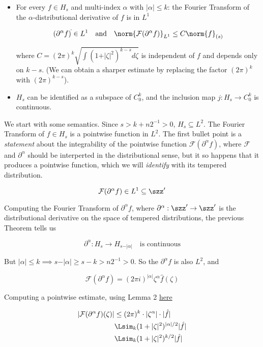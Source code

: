 \begin{itemize}
\item
  For every \(f\in H_s\) and multi-index \(\alpha\) with
  \(\vert\alpha\vert\leq k\): the Fourier Transform of the
  \(\alpha\)-distributional derivative of \(f\) is in \(L^1\)

  \[
    (\partial^\alpha f)^{\hat{ }}\in L^1\quad\text{and}\quad \norm{\mathcal{F}(\partial^\alpha f)}_{L^1}\leq C\norm{f}_{(s)}
    \]

  where \(C=(2\pi)^k\sqrt{\int (1+\vert\zeta\vert^2)^{k-s}d\zeta}\) is
  independent of \(f\) and depends only on \(k-s\). (We can obtain a
  sharper estimate by replacing the factor \((2\pi)^k\) with
  \((2\pi)^{k-s}\)).
\item
  \(H_s\) can be identified as a subspace of \(C_0^k\), and the
  inclusion map \(j: H_s\to C_0^k\) is continuous.
\end{itemize}

We start with some semantics. Since \(s>k+n2^{-1}>0\),
\(H_s\subseteq L^2\). The Fourier Transform of \(f\in H_s\) is a
pointwise function in \(L^2\). The first bullet point is a
\emph{statement} about the integrability of the pointwise function
\(\mathcal{F}(\partial^\alpha f)\), where \(\mathcal{F}\) and
\(\partial^\alpha\) should be interperted in the distributional sense,
but it so happens that it produces a pointwise function, which we will
\emph{identify} with its tempered distribution.

\[
\mathcal{F}(\partial^\alpha f)\in L^1\subseteq\szz'
\]

Computing the Fourier Transform of \(\partial^\alpha f\), where
\(\partial^\alpha: \szz'\to\szz'\) is the distributional derivative on
the space of tempered distributions, the previous Theorem tells us

\[
\partial^\alpha: H_s\to H_{s-\vert\alpha\vert}\quad\text{is continuous}
\]

But
\(\vert\alpha\vert\leq k\implies s-\vert\alpha\vert \geq s-k > n2^{-1}>0\).
So the \(\partial^\alpha f\) is also \(L^2\), and

\[
\mathcal{F}(\partial^\alpha f) = (2\pi i)^{\vert\alpha\vert}\zeta^{\alpha}\hat{f}(\zeta)
\]

Computing a pointwise estimate, using Lemma 2
\href{\%7B\%7B\%20site.baseurl\%20\%7D\%7D/\%7B\%\%20post_url\%202023-08-12-folland-distribution-excerpts\%20\%\%7D\#chapter-8}{here}

\[
\begin{align}
\vert\mathcal{F}(\partial^\alpha f)(\zeta)\vert&\leq(2\pi)^{k}\cdot\vert \zeta^\alpha\vert\cdot \vert\hat{f}\vert\\
&\Lsim_k (1+\vert\zeta\vert^2)^{\vert\alpha\vert/2}\vert\hat{f}\vert\\
&\Lsim_k (1+\vert\zeta\vert^2)^{k/2}\vert\hat{f}\vert\\
\end{align}
\]

